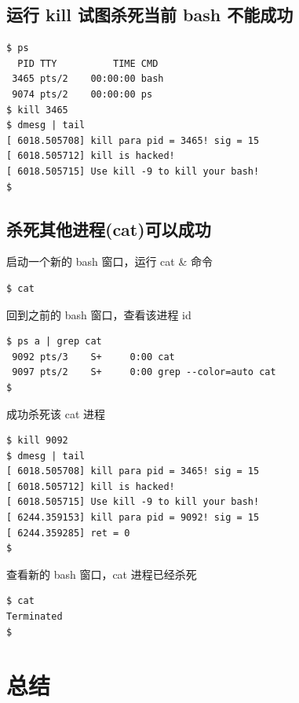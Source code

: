 \subsection{运行 kill 试图杀死当前 bash 不能成功}

{\begin{shaded}\begin{verbatim}
$ ps
  PID TTY          TIME CMD
 3465 pts/2    00:00:00 bash
 9074 pts/2    00:00:00 ps
$ kill 3465
$ dmesg | tail
[ 6018.505708] kill para pid = 3465! sig = 15
[ 6018.505712] kill is hacked!
[ 6018.505715] Use kill -9 to kill your bash!
$ 
\end{verbatim}\end{shaded}}
\subsection{杀死其他进程(cat)可以成功}

启动一个新的 bash 窗口，运行 cat \& 命令

{\begin{shaded}\begin{verbatim}
$ cat 
\end{verbatim}\end{shaded}}
回到之前的 bash 窗口，查看该进程 id

{\begin{shaded}\begin{verbatim}
$ ps a | grep cat
 9092 pts/3    S+     0:00 cat
 9097 pts/2    S+     0:00 grep --color=auto cat
$
\end{verbatim}\end{shaded}}
成功杀死该 cat 进程

{\begin{shaded}\begin{verbatim}
$ kill 9092
$ dmesg | tail
[ 6018.505708] kill para pid = 3465! sig = 15
[ 6018.505712] kill is hacked!
[ 6018.505715] Use kill -9 to kill your bash!
[ 6244.359153] kill para pid = 9092! sig = 15
[ 6244.359285] ret = 0
$ 
\end{verbatim}\end{shaded}}
查看新的 bash 窗口，cat 进程已经杀死

{\begin{shaded}\begin{verbatim}
$ cat
Terminated
$ 
\end{verbatim}\end{shaded}}
\section{总结}

